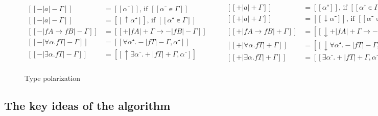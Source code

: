 \begin{figure}[h]
  \begin{equation*}
  \begin{aligned}
    [[-| a |-Γ]] &= [[α⁻]]  \text{,~if $[[α⁻ ∊ Γ]]$}\\
    [[-| a |-Γ]] &= [[↑α⁺]] \text{,~if $[[α⁺ ∊ Γ]]$}\\
    [[-| fA → fB |-Γ]] &= [[ +|fA|+Γ → -|fB|-Γ  ]] \\
    [[-| ∀α.fT |-Γ]] &= [[ ∀α⁺.-|fT|-Γ,α⁺ ]] \\
    [[-| ∃α.fT |-Γ]] &= [[ ↑ ∃α⁻.+|fT|+Γ,α⁻ ]] \\
  \end{aligned}
  \qquad
  \begin{aligned}
    [[+| a |+Γ]] &= [[α⁺]]  \text{,~if $[[α⁺ ∊ Γ]]$}\\
    [[+| a |+Γ]] &= [[↓α⁻]] \text{,~if $[[α⁻ ∊ Γ]]$}\\
    [[+| fA → fB |+Γ]] &= [[ ↓ +|fA|+Γ → -|fB|-Γ  ]] \\
    [[+| ∀α.fT |+Γ]] &= [[ ↓∀α⁺.-|fT|-Γ,α⁺ ]] \\
    [[+| ∃α.fT |+Γ]] &= [[ ∃α⁻.+|fT|+Γ,α⁻ ]] \\
  \end{aligned}
  \end{equation*}
  \caption{Type polarization}
  \label{fig:polarization}
\end{figure}

\subsection{The key ideas of the algorithm}

